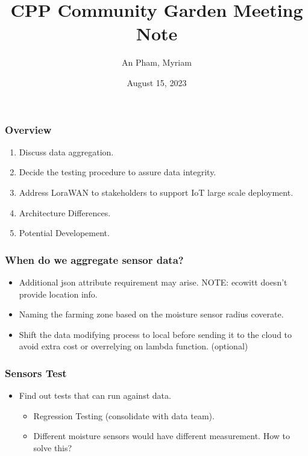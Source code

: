 \documentclass{beamer}
\title{CPP Community Garden Meeting Note}
\author{An Pham, Myriam}
\institute{Calpoly Pomona}
\date{August 15, 2023}
\begin{document}
\frame{\titlepage}

\begin{frame}
\frametitle{Overview}
\begin{enumerate}
  \item  Discuss data aggregation.
   \item Decide the testing procedure to assure data integrity.
   \item Address LoraWAN to stakeholders to support IoT large scale deployment.
   \item Architecture Differences.
   \item Potential Developement. 
 \end{enumerate}
\end{frame}

\begin{frame}
  \frametitle{When do we aggregate sensor data?}
  \begin{itemize}
        \item Additional json attribute requirement may arise. NOTE: ecowitt doesn't provide location info.
    \item Naming the farming zone based on the moisture sensor radius coverate. 
    \item Shift the data modifying process to local before sending it to the cloud to avoid extra cost or overrelying on lambda function. (optional)
  \end{itemize}
 \end{frame}

\begin{frame}
  \frametitle{Sensors Test}
  \begin{itemize}
    \item Find out tests that can run against data.
      \begin{itemize}
        \item Regression Testing (consolidate with data team). 
	\item Different moisture sensors would have different measurement. How to solve this?
      \end{itemize}
  \end{itemize}
\end{frame}
\end{document}
